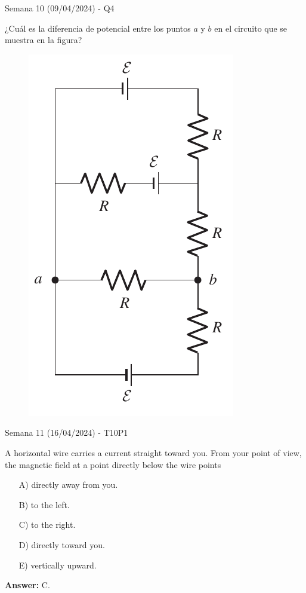 \begin{frame}{Semana 10 (09/04/2024) - Q4}

¿Cuál es la diferencia de potencial entre los puntos $a$ y $b$ en el circuito que se muestra en la figura?

\begin{figure}[H]
        \centering
        \includegraphics[scale=0.3]{figures/q4.png}
    \end{figure}
    
\end{frame}

\begin{frame}{Semana 11 (16/04/2024) - T10P1}
    
    A horizontal wire carries a current straight toward you. From your point of view, the magnetic field at a point directly below the wire points
    
    \begin{itemize}
        \item[A)] directly away from you.
        \item[B)] to the left.
        \item[C)] to the right.
        \item[D)] directly toward you.
        \item[E)] vertically upward.
    \end{itemize}
    
     \pause \centering \textbf{Answer:} C.
    
\end{frame}

